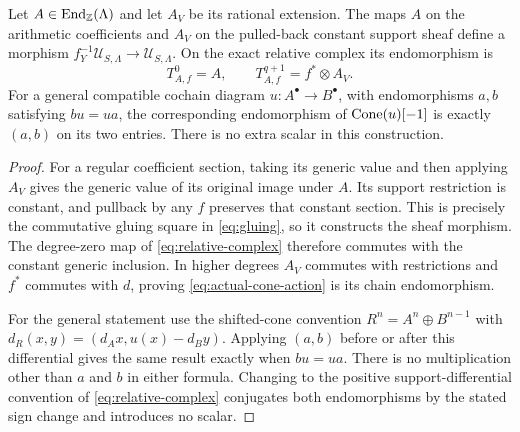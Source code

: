 \begin{theorem}
\label{thm:cone-action}
Let $A\in\operatorname{End}_{\mathbb Z}(\Lambda)$ and let $A_V$ be its
rational extension. The maps $A$ on the arithmetic coefficients
and $A_V$ on the pulled-back constant support sheaf define a morphism
$f_Y^{-1}\mathcal U_{S,\Lambda}\to\mathcal U_{S,\Lambda}$.
On the exact relative complex its endomorphism is
\[
 T_{A,f}^0=A,\qquad
 T_{A,f}^{q+1}=f^*\otimes A_V.
 \tag{SE7}\label{eq:actual-cone-action}
\]
For a general compatible cochain diagram $u:A^\bullet\to B^\bullet$,
with endomorphisms $a,b$ satisfying $bu=ua$, the corresponding
endomorphism of $\operatorname{Cone}(u)[-1]$ is exactly $(a,b)$ on its two entries.
There is no extra scalar in this construction.
\end{theorem}
\begin{proof}
For a regular coefficient section, taking its generic value and then
applying $A_V$ gives the generic value of its original image under $A$.
Its support restriction is constant, and pullback by any $f$ preserves
that constant section. This is precisely the commutative gluing square
in \eqref{eq:gluing}, so it constructs the sheaf morphism.
The degree-zero map of \eqref{eq:relative-complex} therefore commutes
with the constant generic inclusion. In higher degrees
$A_V$ commutes with restrictions and $f^*$ commutes with $d$, proving
\eqref{eq:actual-cone-action} is its chain endomorphism.

For the general statement use the shifted-cone convention
$R^n=A^n\oplus B^{n-1}$ with
$d_R(x,y)=(d_Ax,u(x)-d_By)$. Applying $(a,b)$ before or after this
differential gives the same result exactly when $bu=ua$.
There is no multiplication other than $a$ and $b$ in either formula.
Changing to the positive support-differential convention of
\eqref{eq:relative-complex} conjugates both endomorphisms by the stated
sign change and introduces no scalar.
\end{proof}

